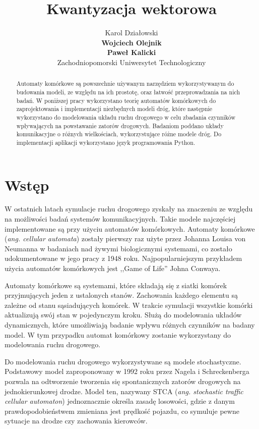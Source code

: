 \documentclass{article}
\title{Kwantyzacja wektorowa}
\author{
  Karol Działowski \\
  \textbf{Wojciech Olejnik} \\
  \textbf{Paweł Kalicki} \\
  Zachodniopomorski Uniwersytet Technologiczny
}
\begin{document}
\maketitle
\begin{abstract}
Automaty komórkowe są powszechnie używanym narzędziem wykorzystywanym do budowania modeli, ze względu na ich prostotę, oraz łatwość przeprowadzania na nich badań. W poniższej pracy wykorzystano teorię automatów komórkowych do zaprojektowania i implementacji niezbędnych modeli dróg, które następnie wykorzystano do modelowania układu ruchu drogowego w celu zbadania czynników wpływających na powstawanie zatorów drogowych. Badaniom poddano układy komunikacyjne o różnych wielkościach, wykorzystujące różne modele dróg. Do implementacji aplikacji wykorzystano język programowania Python.
\end{abstract}




\section{Wstęp}
W ostatnich latach symulacje ruchu drogowego zyskały na znaczeniu ze względu na możliwości badań systemów komunikacyjnych. Takie modele najczęściej implementowane są przy użyciu automatów komórkowych. Automaty komórkowe (\emph{ang. cellular automata}) zostały pierwszy raz użyte przez Johanna Louisa von Neumanna w badaniach nad żywymi biologicznymi systemami, co zostało udokumentowane w jego pracy z 1948 roku. \cite{von1948} Najpopularniejszym przykładem użycia automatów komórkowych jest ,,Game of Life'' Johna Conwaya. \cite{games1970fantastic}

Automaty komórkowe są systemami, które składają się z siatki komórek przyjmujących jeden z ustalonych stanów. Zachowania każdego elementu są zależne od stanu sąsiadujących komórek. W trakcie symulacji wszystkie komórki aktualizują swój stan w pojedynczym kroku. Służą do modelowania układów dynamicznych, które umożliwiają badanie wpływu różnych czynników na badany model. W tym przypadku automat komórkowy zostanie wykorzystany do modelowania ruchu drogowego.

Do modelowania ruchu drogowego wykorzystywane są modele stochastyczne. Podstawowy model zaproponowany w 1992 roku przez Nagela i Schreckenberga pozwala na odtworzenie tworzenia się spontanicznych zatorów drogowych na jednokierunkowej drodze. \cite{nagel1992cellular} Model ten, nazywany STCA (\emph{ang. stochastic traffic cellular automaton}) jednoznacznie określa zasadę losowości, gdzie z danym prawdopodobieństwem zmieniana jest prędkość pojazdu, co symuluje pewne sytuacje na drodze czy zachowania kierowców.
\end{document}
